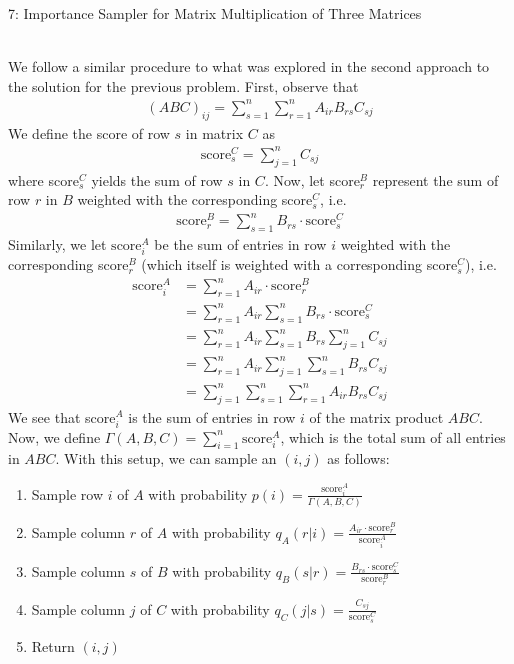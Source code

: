 \documentclass[12pt]{article}
\begin{document}
\begin{problem}{7: Importance Sampler for Matrix Multiplication of Three Matrices}
\end{problem}
\begin{solution} \ \\
We follow a similar procedure to what was explored in the second approach to the solution for the previous problem. First, observe that 
\begin{align*}
    (ABC)_{ij} = \sum\limits_{s=1}^n\sum\limits_{r=1}^n A_{ir}B_{rs}C_{sj}
\end{align*}
We define the score of row $s$ in matrix $C$ as 
\begin{align*}
    \text{score}_s^C = \sum\limits_{j = 1}^n C_{sj}
\end{align*}
where score$_s^C$ yields the sum of row $s$ in $C$. Now, let score$_r^B$ represent the sum of row $r$ in $B$ weighted with the corresponding score$_s^C$, i.e. 
\begin{align*}
    \text{score}_r^B = \sum\limits_{s=1}^n B_{rs}\cdot \text{score}_s^C
\end{align*}
Similarly, we let $\text{score}_i^A$ be the sum of entries in row $i$ weighted with the corresponding score$_r^B$ (which itself is weighted with a corresponding score$_s^C$), i.e. 
\begin{align*}
    \text{score}_i^A &= \sum\limits_{r=1}^n A_{ir} \cdot \text{score}_r^B \\
    &= \sum\limits_{r=1}^n A_{ir} \sum\limits_{s=1}^n B_{rs} \cdot \text{score}_s^C \\
    &= \sum\limits_{r=1}^n A_{ir} \sum\limits_{s=1}^n B_{rs} \sum\limits_{j=1}^n C_{sj} \\
    &= \sum\limits_{r=1}^n A_{ir} \sum\limits_{j=1}^n \sum\limits_{s=1}^n B_{rs}C_{sj} \\
    &= \sum\limits_{j=1}^n\sum\limits_{s=1}^n\sum\limits_{r=1}^n A_{ir}B_{rs}C_{sj}
\end{align*}
We see that score$_i^A$ is the sum of entries in row $i$ of the matrix product $ABC$. Now, we define $\Gamma(A,B,C) = \sum\limits_{i=1}^n \text{score}_{i}^A$, which is the total sum of all entries in $ABC$. With this setup, we can sample an $(i,j)$ as follows:
\begin{enumerate}
    \item Sample row $i$ of $A$ with probability $p(i) = \frac{\text{score}_i^A}{\Gamma(A,B,C)}$
    \item Sample column $r$ of $A$ with probability $q_A(r|i) = \frac{A_{ir}\cdot \text{score}_r^B}{\text{score}_i^A}$
    \item Sample column $s$ of $B$ with probability $q_B(s|r) = \frac{B_{rs} \cdot \text{score}_s^C}{\text{score}_r^B}$
    \item Sample column $j$ of $C$ with probability $q_C(j|s) = \frac{C_{sj}}{\text{score}_s^C}$
    \item Return $(i, j)$
\end{enumerate}


\end{solution}
\end{document}
